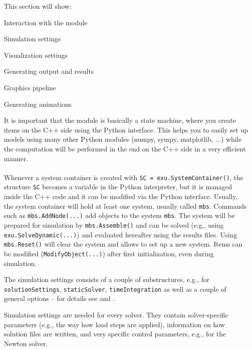 This section will show:
\bi
  \item Interaction with the \codeName module
  \item Simulation settings
  \item Visualization settings
  \item Generating output and results
  \item Graphics pipeline
  \item Generating animations
\ei

It is important that the \codeName module is basically a state machine, where you create items on the C++ side using the Python interface. This helps you to easily set up models using many other Python modules (numpy, sympy, matplotlib, ...) while the computation will be performed in the end on the C++ side in a very efficient manner. 
\vspace{12pt}\\
\vspace{6pt}\\
Whenever a system container is created with \texttt{SC = exu.SystemContainer()}, the structure \texttt{SC} becomes a variable in the Python interpreter, but it is managed inside the C++ code and it can be modified via the Python interface.
Usually, the system container will hold at least one system, usually called \texttt{mbs}.
Commands such as \texttt{mbs.AddNode(...)} add objects to the system \texttt{mbs}. 
The system will be prepared for simulation by \texttt{mbs.Assemble()} and can be solved (e.g., using \texttt{exu.SolveDynamic(...)}) and evaluated hereafter using the results files.
Using \texttt{mbs.Reset()} will clear the system and allows to set up a new system. Items can be modified (\texttt{ModifyObject(...)}) after first initialization, even during simulation.
%

The simulation settings consists of a couple of substructures, e.g., for \texttt{solutionSettings}, \texttt{staticSolver}, \texttt{timeIntegration} as well as a couple of general options -- for details see  and .

Simulation settings are needed for every solver. They contain solver-specific parameters (e.g., the way how load steps are applied), information on how solution files are written, and very specific control parameters, e.g., for the Newton solver. 

